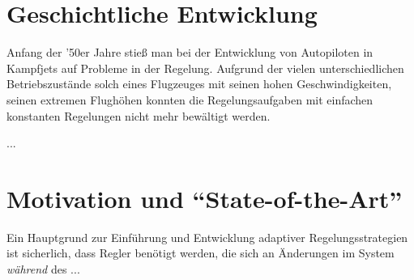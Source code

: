 \section{Geschichtliche Entwicklung }

Anfang der '50er Jahre stieß man bei der Entwicklung von Autopiloten
in Kampfjets auf Probleme in der Regelung. Aufgrund der vielen unterschiedlichen
Betriebszustände solch eines Flugzeuges mit seinen hohen Geschwindigkeiten,
seinen extremen Flughöhen konnten die Regelungsaufgaben mit einfachen
konstanten Regelungen nicht mehr bewältigt werden. 

...


\section{Motivation und {}``State-of-the-Art''}

Ein Hauptgrund zur Einführung und Entwicklung adaptiver Regelungsstrategien
ist sicherlich, dass Regler benötigt werden, die sich an Änderungen
im System \textit{während} des ... 

\cleardoublepage
